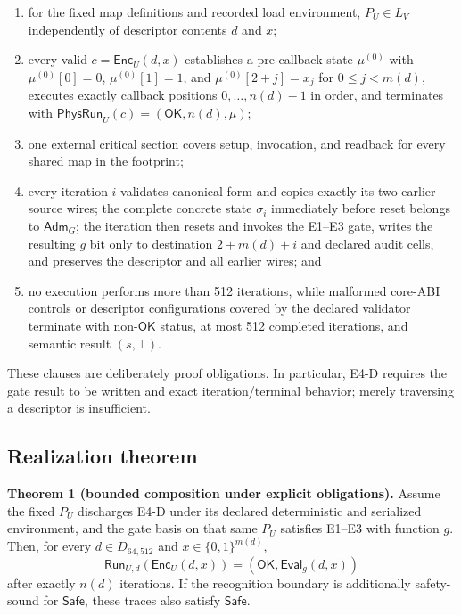 \documentclass[conference]{IEEEtran}
\begin{document}
\begin{enumerate}
\item for the fixed map definitions and recorded load environment, $P_U\in L_V$ independently of descriptor contents $d$ and $x$;
\item every valid $c=\mathsf{Enc}_U(d,x)$ establishes a pre-callback state $\mu^{(0)}$ with $\mu^{(0)}[0]=0$, $\mu^{(0)}[1]=1$, and $\mu^{(0)}[2+j]=x_j$ for $0\le j<m(d)$, executes exactly callback positions $0,\ldots,n(d)-1$ in order, and terminates with $\mathsf{PhysRun}_U(c)=(\mathsf{OK},n(d),\mu)$;
\item one external critical section covers setup, invocation, and readback for every shared map in the footprint;
\item every iteration $i$ validates canonical form and copies exactly its two earlier source wires; the complete concrete state $\sigma_i$ immediately before reset belongs to $\mathsf{Adm}_G$; the iteration then resets and invokes the E1--E3 gate, writes the resulting $g$ bit only to destination $2+m(d)+i$ and declared audit cells, and preserves the descriptor and all earlier wires; and
\item no execution performs more than 512 iterations, while malformed core-ABI controls or descriptor configurations covered by the declared validator terminate with non-$\mathsf{OK}$ status, at most 512 completed iterations, and semantic result $(s,\bot)$.
\end{enumerate}

These clauses are deliberately proof obligations. In particular, E4-D requires the gate result to be written and exact iteration/terminal behavior; merely traversing a descriptor is insufficient.

\subsection{Realization theorem}

\medskip
\noindent\textbf{Theorem 1 (bounded composition under explicit obligations).}
Assume the fixed $P_U$ discharges E4-D under its declared deterministic and serialized environment, and the gate basis on that same $P_U$ satisfies E1--E3 with function $g$. Then, for every $d\in D_{64,512}$ and $x\in\{0,1\}^{m(d)}$,
\begin{equation}
\mathsf{Run}_{U,d}(\mathsf{Enc}_U(d,x))
=(\mathsf{OK},\mathsf{Eval}_g(d,x))
\end{equation}
after exactly $n(d)$ iterations. If the recognition boundary is additionally safety-sound for $\mathsf{Safe}$, these traces also satisfy $\mathsf{Safe}$.
\end{document}
